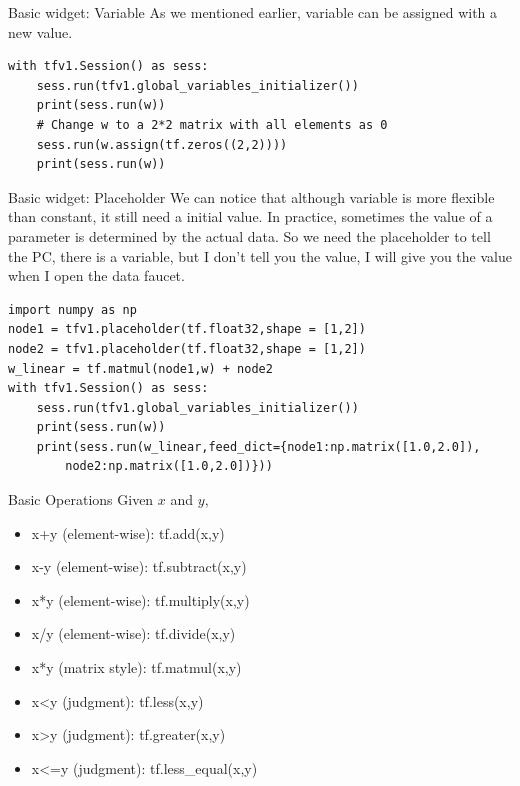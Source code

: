 \documentclass{beamer}
\begin{document}
\begin{frame}[fragile]{Basic widget: Variable}
As we mentioned earlier, variable can be assigned with a new value. 
\begin{lstlisting}[style = Python]
with tfv1.Session() as sess:
    sess.run(tfv1.global_variables_initializer())
    print(sess.run(w))
    # Change w to a 2*2 matrix with all elements as 0
    sess.run(w.assign(tf.zeros((2,2)))) 
    print(sess.run(w))
\end{lstlisting}
\end{frame}


\begin{frame}[fragile]{Basic widget: Placeholder}
We can notice that although variable is more flexible than constant, it still need a initial value. In practice, sometimes the value of a parameter is determined by the actual data. So we need the placeholder to tell the PC, there is a variable, but I don't tell you the value, I will give you the value when I open the data faucet.
\begin{lstlisting}[style = Python]
import numpy as np
node1 = tfv1.placeholder(tf.float32,shape = [1,2])
node2 = tfv1.placeholder(tf.float32,shape = [1,2])
w_linear = tf.matmul(node1,w) + node2
with tfv1.Session() as sess:
    sess.run(tfv1.global_variables_initializer())
    print(sess.run(w))
    print(sess.run(w_linear,feed_dict={node1:np.matrix([1.0,2.0]),
    	node2:np.matrix([1.0,2.0])}))
\end{lstlisting}
\end{frame}

\begin{frame}[fragile]{Basic Operations}
Given $x$ and $y$,
\begin{itemize}
	\item x+y (element-wise): tf.add(x,y)
	\item x-y (element-wise): tf.subtract(x,y)
	\item x*y (element-wise): tf.multiply(x,y)
	\item x/y (element-wise): tf.divide(x,y)
	\item x*y (matrix style): tf.matmul(x,y)
	\item x<y (judgment): tf.less(x,y)
	\item x>y (judgment): tf.greater(x,y)
	\item x<=y (judgment): tf.less\_equal(x,y)
\end{itemize}
\end{frame}
\end{document}
